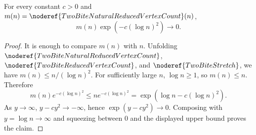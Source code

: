 \begin{helper}
For every constant \(c>0\) and
\(m(n)=\noderef{TwoBiteNaturalReducedVertexCount}(n)\),
\[
  m(n)\exp\!\left(-c(\log n)^2\right)\to 0 .
\]
\end{helper}
\begin{proof}
It is enough to compare \(m(n)\) with \(n\).  Unfolding
\(\noderef{TwoBiteNaturalReducedVertexCount}\),
\(\noderef{TwoBiteReducedVertexCount}\), and \(\noderef{TwoBiteStretch}\),
we have \(m(n)\le n/(\log n)^2\).  For sufficiently large \(n\),
\(\log n\ge1\), so \(m(n)\le n\).  Therefore
\[
  m(n)e^{-c(\log n)^2}
  \le n e^{-c(\log n)^2}
  = \exp(\log n-c(\log n)^2).
\]
As \(y\to\infty\), \(y-cy^2\to-\infty\), hence
\(\exp(y-cy^2)\to0\).  Composing with \(y=\log n\to\infty\) and squeezing
between \(0\) and the displayed upper bound proves the claim.
\end{proof}
